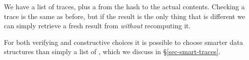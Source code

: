 We have a list of traces, plus a  from the hash to the actual contents. Checking a trace is the same as before, but if the result is the only thing that is different we can simply retrieve a fresh result from  \textit{without} recomputing it.

For both verifying and constructive choices it is possible to choose smarter data structures than simply a list of , which we discuss in \S\ref{sec-smart-traces}.

